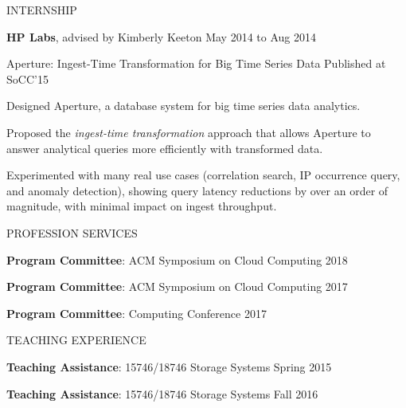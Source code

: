 \documentclass{resume} %
\begin{document}

\begin{rSection}{INTERNSHIP}

\hspace{-1em} \textbf{HP Labs}, advised by Kimberly Keeton \hfill {May 2014 to Aug 2014}

\vspace{-.1in}
\begin{rSubsection}{\hspace{-1em} Aperture: Ingest-Time Transformation for Big Time Series Data}{}
{Published at SoCC'15}{}
\vspace{-0.3em}
\item Designed Aperture, a database system for big time series data analytics.
\item Proposed the \emph{ingest-time transformation} approach that allows Aperture to answer analytical queries more efficiently with transformed data.
\item Experimented with many real use cases (correlation search, IP occurrence query, and anomaly detection), showing query latency reductions by over an order of magnitude, with minimal impact on ingest throughput.
\end{rSubsection}

\end{rSection}
\vspace{-.05in}


\begin{rSection}{PROFESSION SERVICES}

\hspace{-1em} \textbf{Program Committee}: ACM Symposium on Cloud Computing \hfill {2018}

\vspace{-.1in}
\hspace{-1em} \textbf{Program Committee}: ACM Symposium on Cloud Computing \hfill {2017}

\vspace{-.1in}
\hspace{-1em} \textbf{Program Committee}: Computing Conference \hfill {2017}

\end{rSection}
\vspace{-.05in}


\begin{rSection}{TEACHING EXPERIENCE}

\hspace{-1em} \textbf{Teaching Assistance}: 15746/18746 Storage Systems \hfill {Spring 2015}

\vspace{-.1in}
\hspace{-1em} \textbf{Teaching Assistance}: 15746/18746 Storage Systems \hfill {Fall 2016}

\end{rSection}
\vspace{-.05in}
\end{document}
